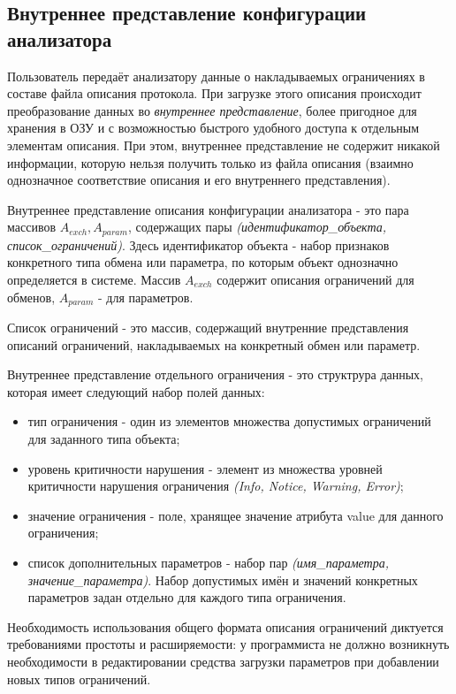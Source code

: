 \subsection{Внутреннее представление конфигурации анализатора}
\label{subsec:inner}

Пользователь передаёт анализатору данные о накладываемых ограничениях в составе 
файла описания протокола. При загрузке этого описания происходит преобразование 
данных во \textit{внутреннее представление}, более пригодное для хранения в ОЗУ 
и с возможностью быстрого удобного доступа к отдельным элементам описания. При 
этом, внутреннее представление не содержит никакой информации, которую нельзя 
получить только из файла описания (взаимно однозначное соответствие описания и 
его внутреннего представления).

Внутреннее представление описания конфигурации анализатора - это пара массивов 
$A_{exch}, A_{param}$, содержащих пары \textit{(идентификатор\_объекта, 
список\_ограничений)}. Здесь идентификатор объекта - набор признаков 
конкретного типа обмена или параметра, по которым объект однозначно 
определяется в системе. Массив $A_{exch}$ содержит описания ограничений для 
обменов, $A_{param}$ - для параметров. 

Список ограничений - это массив, содержащий внутренние представления описаний 
ограничений, накладываемых на конкретный обмен или параметр. 

Внутреннее представление отдельного ограничения - это структрура данных, 
которая имеет следующий набор полей данных:

\begin{itemize}
 \item тип ограничения - один из элементов множества допустимых ограничений для 
заданного типа объекта;
 \item уровень критичности нарушения - элемент из множества уровней критичности 
нарушения ограничения \textit{(Info, Notice, Warning, Error)};
 \item значение ограничения - поле, хранящее значение атрибута value для 
данного ограничения;
 \item список дополнительных параметров - набор пар \textit{(имя\_параметра, 
значение\_параметра)}. Набор допустимых имён и значений конкретных параметров 
задан отдельно для каждого типа ограничения.
\end{itemize}

Необходимость использования общего формата описания ограничений диктуется 
требованиями простоты и расширяемости: у программиста не должно возникнуть 
необходимости в редактировании средства загрузки параметров при добавлении 
новых типов ограничений.

